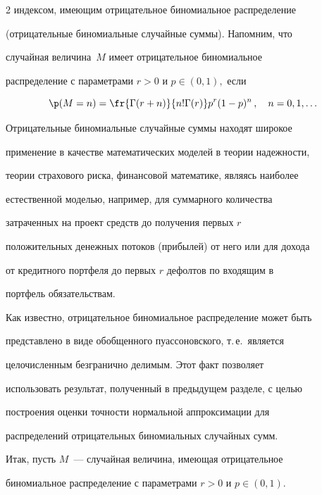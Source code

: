 \begin{multicols}{2}
индексом, имеющим отрицательное биномиальное распределение


(отрицательные биномиальные случайные суммы). Напомним, что


случайная величина~$M$ имеет отрицательное биномиальное


распределение с параметрами $r>0$ и $p \in (0,1),$ если


\begin{equation}


 \p(M=n) =


\fr{\Gamma(r+n)}{n!\Gamma(r)}p^r(1-p)^n\,,\quad  n=0,1,\ldots


\label{Tu041}


\end{equation}





Отрицательные биномиальные случайные суммы находят широкое


применение в качестве математических моделей в теории надежности,


тео\-рии страхового риска, финансовой математике, являясь наиболее


естественной моделью, например, для суммарного количества


затраченных на проект средств до получения первых $r$


положительных денежных потоков (прибылей) от него или для дохода


от кредитного портфеля до первых $r$ дефолтов по входящим в


портфель обязательствам.





Как известно, отрицательное биномиальное распределение может быть


представлено в виде обобщенного пуассоновского, т.\,е.\ является


целочисленным безгранично делимым. Этот факт позволяет


 использовать результат, полученный в предыдущем разделе, с целью


построения оценки точности нормальной аппроксимации для


распределений отрицательных биномиальных случайных сумм.





Итак, пусть $M$~--- случайная величина, имеющая отрицательное


биномиальное распределение с параметрами $r>0$ и $p \in (0,1)$.



\end{multicols}
